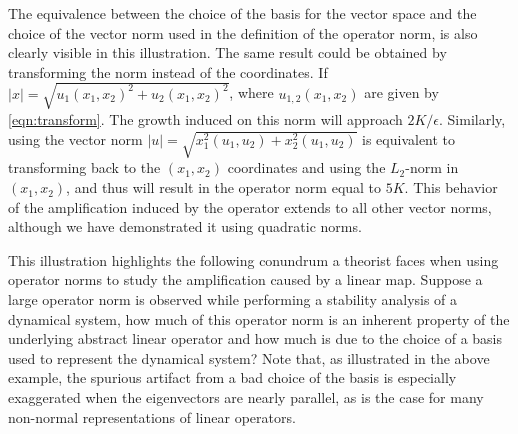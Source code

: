 \documentclass[letterpaper,10pt,prl,twocolumn,aps,reprint,superscriptaddress]{revtex4-1}
\begin{document}
The equivalence between the choice of the basis for the vector space and the choice of the vector norm used in the definition of the operator norm, is also clearly visible in this illustration. The same result could be obtained by transforming the norm instead of the coordinates. If $|x| = \sqrt{u_1(x_1,x_2)^2 + u_2(x_1,x_2)^2}$, where $u_{1,2}(x_1, x_2)$ are given by \eqref{eqn:transform}. The growth induced on this norm will approach $2K/\epsilon$. Similarly, using the vector norm $|u| = \sqrt{x_1^2(u_1,u_2)+x_2^2(u_1,u_2)}$ is equivalent to transforming back to the $(x_1, x_2)$ coordinates and using the $L_2$-norm in $(x_1, x_2)$, and thus will result in the operator norm equal to $5K$. This behavior of the amplification induced by the operator extends to all other vector norms, although we have demonstrated it using quadratic norms.

This illustration highlights the following conundrum a theorist faces when using operator norms to study the amplification caused by a linear map. Suppose a large operator norm is observed while performing a stability analysis of a dynamical system, how much of this operator norm is an inherent property of the underlying abstract linear operator and how much is due to the choice of a basis used to represent the dynamical system? Note that, as illustrated in the above example, the spurious artifact from a bad choice of the basis is especially exaggerated when the eigenvectors are nearly parallel, as is the case for many non-normal representations of linear operators.
\end{document}

